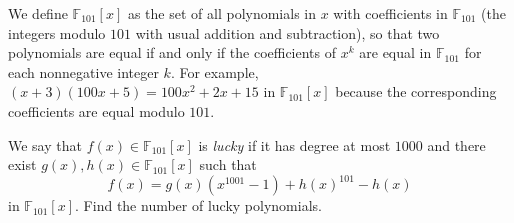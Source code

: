We define $\mathbb F_{101}[x]$ as the set of all polynomials in $x$ with coefficients in $\mathbb F_{101}$ (the integers modulo $101$ with usual addition and subtraction), so that two polynomials are equal if and only if the coefficients of $x^k$ are equal in $\mathbb F_{101}$ for each nonnegative integer $k$. For example, $(x+3)(100x+5)=100x^2+2x+15$ in $\mathbb F_{101}[x]$ because the corresponding coefficients are equal modulo $101$.

We say that $f(x)\in\mathbb F_{101}[x]$ is \emph{lucky} if it has degree at most $1000$ and there exist $g(x),h(x)\in\mathbb F_{101}[x]$ such that \[f(x)=g(x)(x^{1001}-1)+h(x)^{101}-h(x)\]in $\mathbb F_{101}[x]$. Find the number of lucky polynomials.
